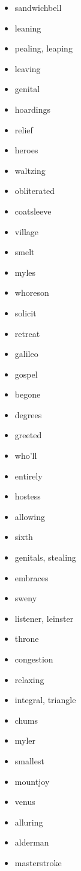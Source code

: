 \documentclass{article}
\begin{document}
\begin{itemize}
    \item sandwichbell
    \item leaning
    \item pealing, leaping
    \item leaving
    \item genital
    \item hoardings
    \item relief
    \item heroes
    \item waltzing
    \item obliterated
    \item coatsleeve
    \item village
    \item smelt
    \item myles
    \item whoreson
    \item solicit
    \item retreat
    \item galileo
    \item gospel
    \item begone
    \item degrees
    \item greeted
    \item who'll
    \item entirely
    \item hostess
    \item allowing
    \item sixth
    \item genitals, stealing
    \item embraces
    \item sweny
    \item listener, leinster
    \item throne
    \item congestion
    \item relaxing
    \item integral, triangle
    \item chums
    \item myler
    \item smallest
    \item mountjoy
    \item venus
    \item alluring
    \item alderman
    \item masterstroke

\end{itemize}
\end{document}
